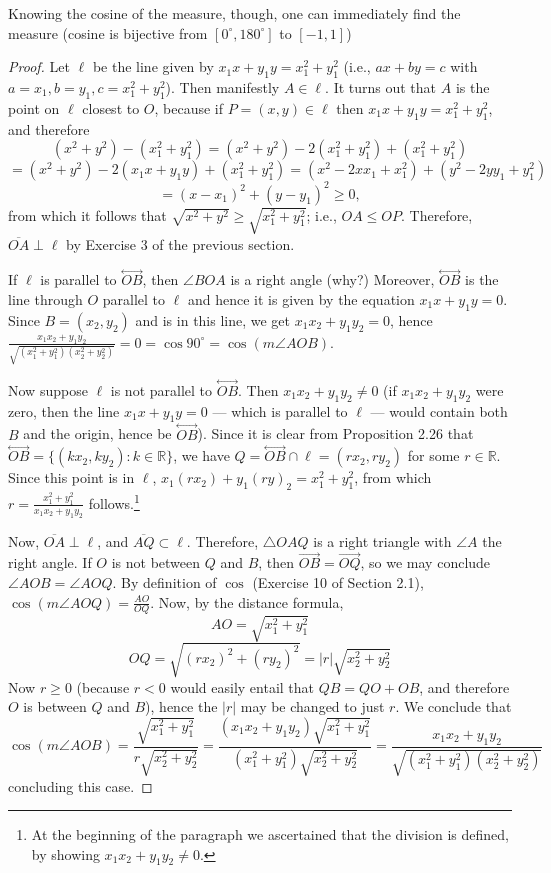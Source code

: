\documentclass[leqno]{book}
\begin{document}
Knowing the cosine of the measure, though, one can immediately find the measure (cosine is bijective from $[0^\circ,180^\circ]$ to $[-1,1]$)
\begin{proof} %
Let $\ell$ be the line given by $x_1x+y_1y=x_1^2+y_1^2$ (i.e., $ax+by=c$ with $a=x_1,b=y_1,c=x_1^2+y_1^2$).  Then manifestly $A\in\ell$.  It turns out that $A$ is the point on $\ell$ closest to $O$, because if $P=(x,y)\in\ell$ then $x_1x+y_1y=x_1^2+y_1^2$, and therefore
$$(x^2+y^2)-(x_1^2+y_1^2)=(x^2+y^2)-2(x_1^2+y_1^2)+(x_1^2+y_1^2)$$
$$=(x^2+y^2)-2(x_1x+y_1y)+(x_1^2+y_1^2)=(x^2-2xx_1+x_1^2)+(y^2-2yy_1+y_1^2)$$
$$=(x-x_1)^2+(y-y_1)^2\geqslant 0,$$
from which it follows that $\sqrt{x^2+y^2}\geqslant\sqrt{x_1^2+y_1^2}$; i.e., $OA\leqslant OP$.  Therefore, $\overline{OA}\perp\ell$ by Exercise 3 of the previous section.

If $\ell$ is parallel to $\overset{\longleftrightarrow}{OB}$, then $\angle BOA$ is a right angle (why?)  Moreover, $\overset{\longleftrightarrow}{OB}$ is the line through $O$ parallel to $\ell$ and hence it is given by the equation $x_1x+y_1y=0$.  Since $B=(x_2,y_2)$ and is in this line, we get $x_1x_2+y_1y_2=0$, hence $\frac{x_1x_2+y_1y_2}{\sqrt{(x_1^2+y_1^2)(x_2^2+y_2^2)}}=0=\cos 90^\circ=\cos(m\angle AOB)$.

Now suppose $\ell$ is not parallel to $\overset{\longleftrightarrow}{OB}$.  Then $x_1x_2+y_1y_2\ne 0$ (if $x_1x_2+y_1y_2$ were zero, then the line $x_1x+y_1y=0$ \---- which is parallel to $\ell$ \---- would contain both $B$ and the origin, hence be $\overset{\longleftrightarrow}{OB}$).  Since it is clear from Proposition 2.26 that $\overset{\longleftrightarrow}{OB}=\{(kx_2,ky_2):k\in\mathbb R\}$, we have $Q=\overset{\longleftrightarrow}{OB}\cap\ell=(rx_2,ry_2)$ for some $r\in\mathbb R$.  Since this point is in $\ell$, $x_1(rx_2)+y_1(ry)_2=x_1^2+y_1^2$, from which $r=\frac{x_1^2+y_1^2}{x_1x_2+y_1y_2}$ follows.\footnote{At the beginning of the paragraph we ascertained that the division is defined, by showing $x_1x_2+y_1y_2\ne 0$.}

Now, $\overline{OA}\perp\ell$, and $\overline{AQ}\subset\ell$.  Therefore, $\triangle OAQ$ is a right triangle with $\angle A$ the right angle.  If $O$ is not between $Q$ and $B$, then $\overset{\longrightarrow}{OB}=\overset{\longrightarrow}{OQ}$, so we may conclude $\angle AOB=\angle AOQ$.  By definition of $\cos$ (Exercise 10 of Section 2.1), $\cos(m\angle AOQ)=\frac{AO}{OQ}$.  Now, by the distance formula,
$$AO=\sqrt{x_1^2+y_1^2}$$
$$OQ=\sqrt{(rx_2)^2+(ry_2)^2}=|r|\sqrt{x_2^2+y_2^2}$$
Now $r\geqslant 0$ (because $r<0$ would easily entail that $QB=QO+OB$, and therefore $O$ is between $Q$ and $B$), hence the $|r|$ may be changed to just $r$.  We conclude that
$$\cos(m\angle AOB)=\frac{\sqrt{x_1^2+y_1^2}}{r\sqrt{x_2^2+y_2^2}}=\frac{(x_1x_2+y_1y_2)\sqrt{x_1^2+y_1^2}}{(x_1^2+y_1^2)\sqrt{x_2^2+y_2^2}}=\frac{x_1x_2+y_1y_2}{\sqrt{(x_1^2+y_1^2)(x_2^2+y_2^2)}}$$
concluding this case.


\end{proof}
\end{document}
